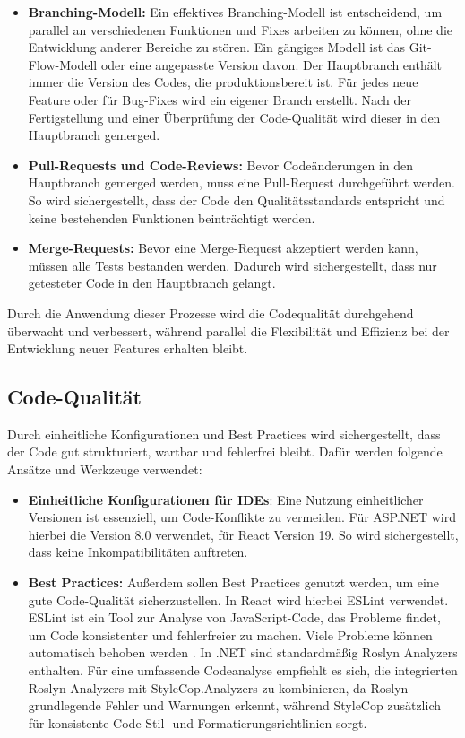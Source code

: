 \documentclass[a4paper,12pt]{article}
\begin{document}
\begin{itemize}
    \item \textbf{Branching-Modell:} Ein effektives Branching-Modell ist entscheidend, um parallel an verschiedenen Funktionen und Fixes arbeiten zu können, ohne die Entwicklung anderer Bereiche zu stören. Ein gängiges Modell ist das Git-Flow-Modell oder eine angepasste Version davon. Der Hauptbranch enthält immer die Version des Codes, die produktionsbereit ist. Für jedes neue Feature oder für Bug-Fixes wird ein eigener Branch erstellt. Nach der Fertigstellung und einer Überprüfung der Code-Qualität wird dieser in den Hauptbranch gemerged.
    \item \textbf{Pull-Requests und Code-Reviews:} Bevor Codeänderungen in den Hauptbranch gemerged werden, muss eine Pull-Request durchgeführt werden. So wird sichergestellt, dass der Code den Qualitätsstandards entspricht und keine bestehenden Funktionen beinträchtigt werden.
    \item \textbf{Merge-Requests:} Bevor eine Merge-Request akzeptiert werden kann, müssen alle Tests bestanden werden. Dadurch wird sichergestellt, dass nur getesteter Code in den Hauptbranch gelangt.
\end{itemize}

Durch die Anwendung dieser Prozesse wird die Codequalität durchgehend überwacht und verbessert, während parallel die Flexibilität und Effizienz bei der Entwicklung neuer Features erhalten bleibt.

\subsection{Code-Qualität}
Durch einheitliche Konfigurationen und Best Practices wird sichergestellt, dass der Code gut strukturiert, wartbar und fehlerfrei bleibt. Dafür werden folgende Ansätze und Werkzeuge verwendet:

\begin{itemize}
    \item \textbf{Einheitliche Konfigurationen für IDEs}: Eine Nutzung einheitlicher Versionen ist essenziell, um Code-Konflikte zu vermeiden. Für \mbox{ASP.NET} wird hierbei die Version 8.0 verwendet, für React Version 19. So wird sichergestellt, dass keine Inkompatibilitäten auftreten.
    \item \textbf{Best Practices:} Außerdem sollen Best Practices genutzt werden, um eine gute Code-Qualität sicherzustellen. In React wird hierbei ESLint verwendet. ESLint ist ein Tool zur Analyse von JavaScript-Code, das Probleme findet, um Code konsistenter und fehlerfreier zu machen. Viele Probleme können automatisch behoben werden \cite{eslint_find_2025}. In .NET sind standardmäßig Roslyn Analyzers enthalten. Für eine umfassende Codeanalyse empfiehlt es sich, die integrierten Roslyn Analyzers mit StyleCop.Analyzers zu kombinieren, da Roslyn grundlegende Fehler und Warnungen erkennt, während StyleCop zusätzlich für konsistente Code-Stil- und Formatierungsrichtlinien sorgt.
\end{itemize}
\end{document}
